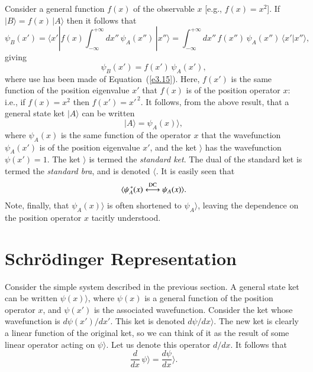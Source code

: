 Consider a general function $f(x)$ of the observable $x$ [{\rm e.g.}, $f(x)=x^2$]. 
If $|B\rangle = f(x)\,|A\rangle$ then it follows that
\begin{equation}
\psi_B(x') = \langle x'| f(x) \int_{-\infty}^{+\infty} dx''\,\psi_A(x'')\,|x''\rangle
= \int_{-\infty}^{+\infty} dx''\, f(x'')\,\psi_A(x'') \,\langle x'|x''\rangle,
\end{equation}
giving
\begin{equation}
\psi_B(x') = f(x')\, \psi_A(x'),
\end{equation}
where use has been made of Equation~(\ref{e3.15}). Here, $f(x')$ is the same function
of the position eigenvalue $x'$ that $f(x)$ is of the position operator $x$:
{\rm i.e.}, if $f(x)=x^2$ then $f(x') = x'^{\,2}$. It follows, from the above result,
that a general state ket $|A \rangle$ can be written
\begin{equation}
|A\rangle = \psi_A(x) \rangle,
\end{equation}
where $\psi_A(x)$ is the same function of the operator $x$ that the wavefunction
$\psi_A(x')$ is of the position eigenvalue $x'$, and the ket $\rangle$ has the
wavefunction $\psi(x') =1$. The ket $\rangle$ is termed the {\em standard ket}. 
The dual of the standard ket is termed the {\em standard bra}, and is
denoted $\langle$.  It is
easily seen that
\begin{equation}\label{e3.25}
\langle \psi_A^{\,\ast}(x) \stackrel{\rm DC}{\longleftrightarrow} \psi_A(x)\rangle.
\end{equation}
Note, finally, that $\psi_A(x)\rangle$ is often shortened to $\psi_A\rangle$, leaving
the dependence on the position operator $x$ tacitly understood. 

\section{Schr\"{o}dinger Representation}\label{s3.4}
Consider the simple system described in the previous section. A general
state ket can be written $\psi(x)\rangle$, where $\psi(x)$ is a general function of
the position operator $x$, and $\psi(x')$ is the associated wavefunction. 
Consider the ket whose wavefunction is $d\psi(x')/dx'$. This ket is
denoted $d\psi/dx\rangle$. The new ket is clearly a linear function of
the  original ket, so we can think of it as the result of some linear
operator acting on $\psi\rangle$. Let us denote this operator
$d/dx$. It follows that
\begin{equation}
\frac{d}{dx}\, \psi\rangle = \frac{d\psi}{dx}\rangle.
\end{equation}

